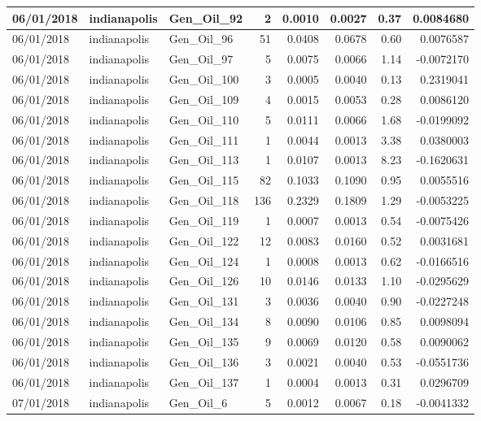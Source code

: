\documentclass[
  letterpaper,
  DIV=11,
  numbers=noendperiod]{scrartcl}
\begin{document}
\begin{tabular}{l|l|l|r|r|r|r|r}
\hline
06/01/2018 & indianapolis & Gen\_Oil\_92 & 2 & 0.0010 & 0.0027 & 0.37 & 0.0084680\\
\hline
06/01/2018 & indianapolis & Gen\_Oil\_96 & 51 & 0.0408 & 0.0678 & 0.60 & 0.0076587\\
\hline
06/01/2018 & indianapolis & Gen\_Oil\_97 & 5 & 0.0075 & 0.0066 & 1.14 & -0.0072170\\
\hline
06/01/2018 & indianapolis & Gen\_Oil\_100 & 3 & 0.0005 & 0.0040 & 0.13 & 0.2319041\\
\hline
06/01/2018 & indianapolis & Gen\_Oil\_109 & 4 & 0.0015 & 0.0053 & 0.28 & 0.0086120\\
\hline
06/01/2018 & indianapolis & Gen\_Oil\_110 & 5 & 0.0111 & 0.0066 & 1.68 & -0.0199092\\
\hline
06/01/2018 & indianapolis & Gen\_Oil\_111 & 1 & 0.0044 & 0.0013 & 3.38 & 0.0380003\\
\hline
06/01/2018 & indianapolis & Gen\_Oil\_113 & 1 & 0.0107 & 0.0013 & 8.23 & -0.1620631\\
\hline
06/01/2018 & indianapolis & Gen\_Oil\_115 & 82 & 0.1033 & 0.1090 & 0.95 & 0.0055516\\
\hline
06/01/2018 & indianapolis & Gen\_Oil\_118 & 136 & 0.2329 & 0.1809 & 1.29 & -0.0053225\\
\hline
06/01/2018 & indianapolis & Gen\_Oil\_119 & 1 & 0.0007 & 0.0013 & 0.54 & -0.0075426\\
\hline
06/01/2018 & indianapolis & Gen\_Oil\_122 & 12 & 0.0083 & 0.0160 & 0.52 & 0.0031681\\
\hline
06/01/2018 & indianapolis & Gen\_Oil\_124 & 1 & 0.0008 & 0.0013 & 0.62 & -0.0166516\\
\hline
06/01/2018 & indianapolis & Gen\_Oil\_126 & 10 & 0.0146 & 0.0133 & 1.10 & -0.0295629\\
\hline
06/01/2018 & indianapolis & Gen\_Oil\_131 & 3 & 0.0036 & 0.0040 & 0.90 & -0.0227248\\
\hline
06/01/2018 & indianapolis & Gen\_Oil\_134 & 8 & 0.0090 & 0.0106 & 0.85 & 0.0098094\\
\hline
06/01/2018 & indianapolis & Gen\_Oil\_135 & 9 & 0.0069 & 0.0120 & 0.58 & 0.0090062\\
\hline
06/01/2018 & indianapolis & Gen\_Oil\_136 & 3 & 0.0021 & 0.0040 & 0.53 & -0.0551736\\
\hline
06/01/2018 & indianapolis & Gen\_Oil\_137 & 1 & 0.0004 & 0.0013 & 0.31 & 0.0296709\\
\hline
07/01/2018 & indianapolis & Gen\_Oil\_6 & 5 & 0.0012 & 0.0067 & 0.18 & -0.0041332\\

\end{tabular}
\end{document}
